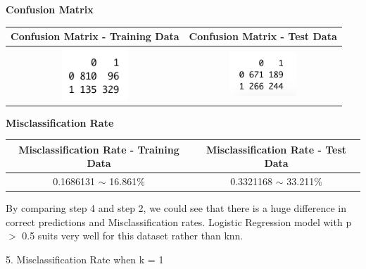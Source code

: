\documentclass[a4paper,10pt]{article}
\begin{document}
\begin{center}
	\textbf{Confusion Matrix} \par
	\begin{tabular}{|c|c|}
		\hline
		Confusion Matrix - Training Data&
		Confusion Matrix - Test Data\\
		\hline
		\cellcolor{yellow!100} \includegraphics[width=25mm,scale=0.10]{Confusion_Matrix_knn_training_Data_1.png} &
		\cellcolor{yellow!100} \includegraphics[width=25mm,scale=0.10]{Confusion_Matrix_knn_test_Data_1.png}\\
		\hline
	\end{tabular}\par \par
	\textbf{Misclassification Rate} \par
	\begin{tabular}{|c|c|}
		\hline
		Misclassification Rate - Training Data&
		Misclassification Rate - Test Data\\
		\hline
		\cellcolor{yellow!100} 0.1686131 $\sim$ 16.861\% & \cellcolor{yellow!100} 0.3321168 $\sim$ 33.211\%\\
		\hline
	\end{tabular}\par
\end{center}\par
By comparing step 4 and step 2, we could see that there is a huge difference in correct predictions and Misclassification rates.
Logistic Regression model with p $>$ 0.5 suits very well for this dataset rather than knn. \par
\vspace{0.5cm}
5. Misclassification Rate when k = 1 \par
\end{document}
